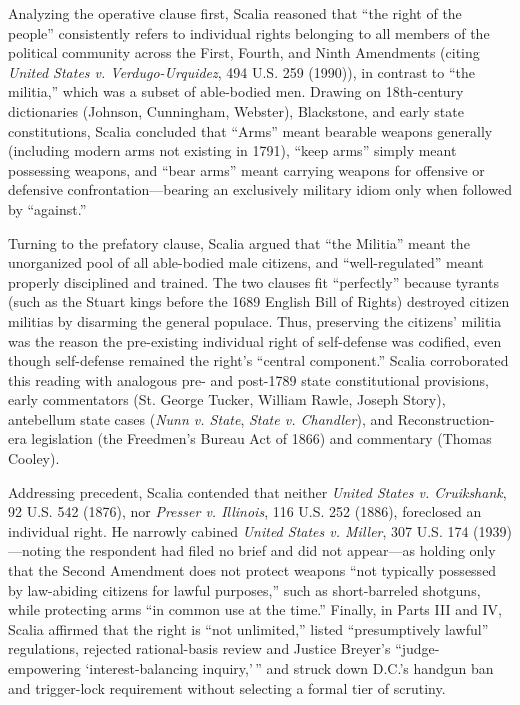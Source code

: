 \documentclass[12pt]{article}
\begin{document}
Analyzing the operative clause first, Scalia reasoned that ``the right of the people'' consistently refers to individual rights belonging to all members of the political community across the First, Fourth, and Ninth Amendments (citing \textit{United States v. Verdugo-Urquidez}, 494 U.S. 259 (1990)), in contrast to ``the militia,'' which was a subset of able-bodied men. Drawing on 18th-century dictionaries (Johnson, Cunningham, Webster), Blackstone, and early state constitutions, Scalia concluded that ``Arms'' meant bearable weapons generally (including modern arms not existing in 1791), ``keep arms'' simply meant possessing weapons, and ``bear arms'' meant carrying weapons for offensive or defensive confrontation---bearing an exclusively military idiom only when followed by ``against.''

Turning to the prefatory clause, Scalia argued that ``the Militia'' meant the unorganized pool of all able-bodied male citizens, and ``well-regulated'' meant properly disciplined and trained. The two clauses fit ``perfectly'' because tyrants (such as the Stuart kings before the 1689 English Bill of Rights) destroyed citizen militias by disarming the general populace. Thus, preserving the citizens' militia was the reason the pre-existing individual right of self-defense was codified, even though self-defense remained the right's ``central component.'' Scalia corroborated this reading with analogous pre- and post-1789 state constitutional provisions, early commentators (St. George Tucker, William Rawle, Joseph Story), antebellum state cases (\textit{Nunn v. State}, \textit{State v. Chandler}), and Reconstruction-era legislation (the Freedmen's Bureau Act of 1866) and commentary (Thomas Cooley).

Addressing precedent, Scalia contended that neither \textit{United States v. Cruikshank}, 92 U.S. 542 (1876), nor \textit{Presser v. Illinois}, 116 U.S. 252 (1886), foreclosed an individual right. He narrowly cabined \textit{United States v. Miller}, 307 U.S. 174 (1939)---noting the respondent had filed no brief and did not appear---as holding only that the Second Amendment does not protect weapons ``not typically possessed by law-abiding citizens for lawful purposes,'' such as short-barreled shotguns, while protecting arms ``in common use at the time.'' Finally, in Parts III and IV, Scalia affirmed that the right is ``not unlimited,'' listed ``presumptively lawful'' regulations, rejected rational-basis review and Justice Breyer's ``judge-empowering `interest-balancing inquiry,'\,'' and struck down D.C.'s handgun ban and trigger-lock requirement without selecting a formal tier of scrutiny.
\end{document}
